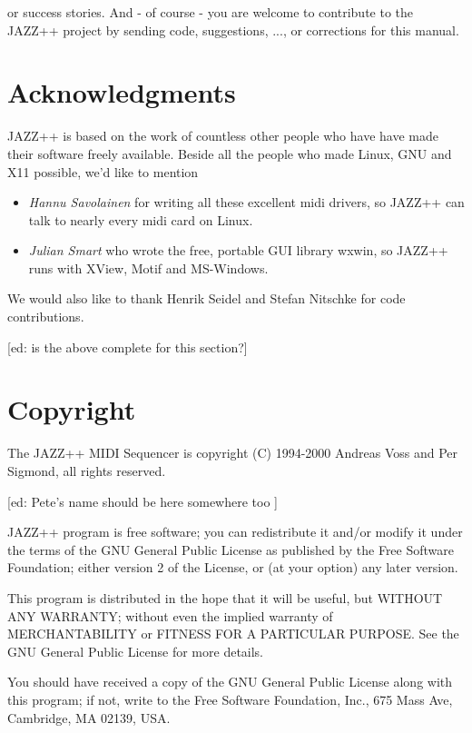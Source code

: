 \documentclass[letterpaper]{report}
\begin{document}
 or success stories. And - of course - you are welcome to contribute to the
JAZZ++ project by sending code, suggestions, ..., or corrections for this
manual.

\section{Acknowledgments}

JAZZ++ is based on the work of countless other people who have have made
their software freely available. Beside all the people who made Linux,
GNU and X11 possible, we'd like to mention

\begin{itemize}
\item {\em Hannu Savolainen} for writing all these excellent midi drivers, so
JAZZ++ can talk to nearly every midi card on Linux.
\item {\em Julian Smart} who wrote the free, portable GUI library
wxwin, so JAZZ++ runs with XView, Motif and MS-Windows.
\end{itemize}

We would also like to thank Henrik Seidel and Stefan Nitschke for code
contributions.

[ed: is the above complete for this section?]

\section{Copyright}\label{copyright}

The JAZZ++ MIDI Sequencer is copyright (C) 1994-2000 Andreas Voss and
Per Sigmond, all rights reserved.

[ed: Pete's name should be here somewhere too ]

JAZZ++ program is free software; you can redistribute it and/or modify
it under the terms of the GNU General Public License as published by
the Free Software Foundation; either version 2 of the License, or
(at your option) any later version.

This program is distributed in the hope that it will be useful,
but WITHOUT ANY WARRANTY; without even the implied warranty of
MERCHANTABILITY or FITNESS FOR A PARTICULAR PURPOSE.  See the
GNU General Public License for more details.

You should have received a copy of the GNU General Public License
along with this program; if not, write to the Free Software
Foundation, Inc., 675 Mass Ave, Cambridge, MA 02139, USA.
\end{document}
